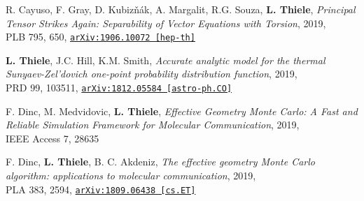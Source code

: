 R. Cayuso, F. Gray, D. Kubiz\v{n}\'{a}k, A. Margalit, R.G. Souza, {\bf L. Thiele},
\emph{Principal Tensor Strikes Again: Separability of Vector Equations with Torsion}, 2019,\\
PLB 795, 650,
\href{https://arxiv.org/abs/1906.10072}{\mbox{\texttt{arXiv:1906.10072 [hep-th]}}}

{\bf L. Thiele}, J.C. Hill, K.M. Smith, \emph{Accurate analytic model for the thermal
Sunyaev-Zel'dovich one-point probability distribution function}, 2019,\\
PRD 99, 103511,
\href{https://arxiv.org/abs/1812.05584}{\mbox{\texttt{arXiv:1812.05584 [astro-ph.CO]}}}

F. Dinc, M. Medvidovic, {\bf L. Thiele}, \emph{Effective Geometry Monte Carlo: A Fast and
Reliable Simulation Framework for Molecular Communication}, 2019,\\
IEEE Access 7, 28635

F. Dinc, {\bf L. Thiele}, B. C. Akdeniz, \emph{The effective geometry Monte Carlo
algorithm: applications to molecular communication}, 2019,\\
PLA 383, 2594,
\href{https://arxiv.org/abs/1809.06438}{\mbox{\texttt{arXiv:1809.06438 [cs.ET]}}}
